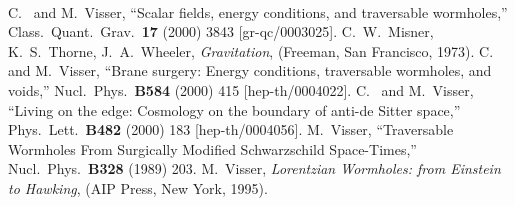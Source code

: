 \documentclass[a4paper,10pt]{article}
\begin{document}
\begin{thebibliography}{99}
\\
C.~{\Barcelo} and M.~Visser,
``Scalar fields, energy conditions, and traversable wormholes,''
Class.\ Quant.\ Grav.\  {\bf 17} (2000) 3843
[gr-qc/0003025].
C.~W.~Misner, K.~S.~Thorne, J.~A.~Wheeler,
{\emph{Gravitation}}, (Freeman, San Francisco, 1973).
C.~{\Barcelo} and M.~Visser,
``Brane surgery: Energy conditions, traversable wormholes, and voids,''
Nucl.\ Phys.\  {\bf B584} (2000) 415 [hep-th/0004022].
C.~{\Barcelo} and M.~Visser,
``Living on the edge: Cosmology on the boundary of anti-de Sitter space,''
Phys.\ Lett.\  {\bf B482} (2000) 183
[hep-th/0004056].
M.~Visser,
``Traversable Wormholes From Surgically Modified Schwarzschild Space-Times,''
Nucl.\ Phys.\  {\bf B328} (1989) 203.
M.~Visser,
{\sl Lorentzian Wormholes: from Einstein to Hawking},
(AIP Press, New York, 1995).
\end{thebibliography} 
\end{document}
